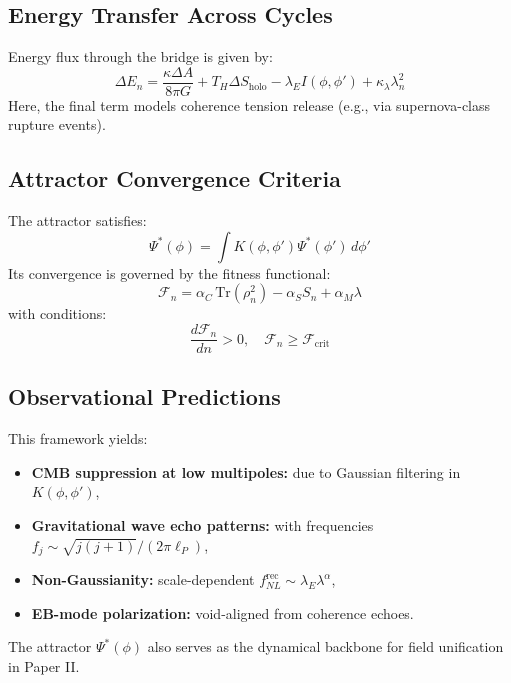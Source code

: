 \subsection{Energy Transfer Across Cycles}

Energy flux through the bridge is given by:
\begin{equation}
\Delta E_n = \frac{\kappa \Delta A}{8\pi G} + T_H \Delta S_{\text{holo}} - \lambda_E I(\phi, \phi') + \kappa_\lambda \lambda_n^2
\end{equation}
Here, the final term models coherence tension release (e.g., via supernova-class rupture events).

\subsection{Attractor Convergence Criteria}

The attractor satisfies:
\begin{equation}
\Psi^*(\phi) = \int K(\phi, \phi') \Psi^*(\phi') \, d\phi'
\end{equation}
Its convergence is governed by the fitness functional:
\begin{equation}
\mathcal{F}_n = \alpha_C \, \text{Tr}(\rho_n^2) - \alpha_S S_n + \alpha_M \lambda
\end{equation}
with conditions:
\begin{equation}
\frac{d\mathcal{F}_n}{dn} > 0, \quad \mathcal{F}_n \geq \mathcal{F}_{\text{crit}}
\end{equation}

\subsection{Observational Predictions}

This framework yields:
\begin{itemize}
    \item \textbf{CMB suppression at low multipoles:} due to Gaussian filtering in \( K(\phi, \phi') \),
    \item \textbf{Gravitational wave echo patterns:} with frequencies \( f_j \sim \sqrt{j(j+1)} / (2\pi \ell_P) \),
    \item \textbf{Non-Gaussianity:} scale-dependent \( f_{NL}^{\text{rec}} \sim \lambda_E \lambda^\alpha \),
    \item \textbf{EB-mode polarization:} void-aligned from coherence echoes.
\end{itemize}
The attractor \( \Psi^*(\phi) \) also serves as the dynamical backbone for field unification in Paper II.

